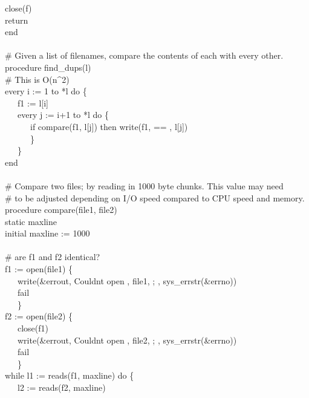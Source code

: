 {\>   close(f) \\
\>   return {\textquotedbl}{\textquotedbl} \\
end \\
\ \\
\# Given a list of filenames, compare the contents of each with every other.\\
procedure find\_dups(l) \\
\>   \# This is O(n\^{}2) \\
\>   every i := 1 to *l do \{ \\
\>   \ \ \ f1 := l[i] \\
\>   \ \ \ every j := i+1 to *l do \{ \\
\>   \ \ \ \ \ \ if compare(f1, l[j]) then write(f1, {\textquotedbl} == {\textquotedbl},
l[j]) \\
\>   \ \ \ \ \ \ \} \\
\>   \ \ \ \} \\
end \\
\ \\
\# Compare two files; by reading in 1000 byte chunks. This value may need\\
\# to be adjusted depending on I/O speed compared to CPU speed and memory. \\
procedure compare(file1, file2) \\
\>   static maxline \\
\>   initial maxline := 1000 \\
\ \\
\>   \# are f1 and f2 identical? \\
\>   f1 := open(file1) {\textbar} \{ \\
\>   \ \ \ write(\&errout, {\textquotedbl}Couldn{\textquotesingle}t
open {\textquotedbl}, file1, {\textquotedbl}; {\textquotedbl}, sys\_errstr(\&errno)) \\
\>   \ \ \ fail \\
\>   \ \ \ \} \\
\>   f2 := open(file2) {\textbar} \{ \\
\>   \ \ \ close(f1) \\
\>   \ \ \ write(\&errout, {\textquotedbl}Couldn{\textquotesingle}t
open {\textquotedbl}, file2, {\textquotedbl}; {\textquotedbl}, sys\_errstr(\&errno)) \\
\>   \ \ \ fail \\
\>   \ \ \ \} \\
\>   while l1 := reads(f1, maxline) do \{ \\
\>   \ \ \ l2 := reads(f2, maxline) {\textbar} \\
}

